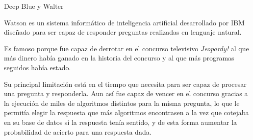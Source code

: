 \documentclass[spanish, a4paper, 12pt]{article} 	%
\begin{document}
\begin{section}{Deep Blue y Walter}
\begin{itemize}
		Watson es un sistema informático de inteligencia artificial desarrollado por IBM diseñado para ser capaz de responder preguntas realizadas en lenguaje natural.
	
		Es famoso porque fue capaz de derrotar en el concurso televisivo \textit{Jeopardy!} al que más dinero había ganado en la historia del concurso y al que más programas seguidos había estado.
	
		Su principal limitación está en el tiempo que necesita para ser capaz de procesar una pregunta y responderla. Aun así fue capaz de vencer en el concurso gracias a la ejecución de miles de algoritmos distintos para la misma pregunta, lo que le permitía elegir la respuesta que más algoritmos encontrasen a la vez que cotejaba en su base de datos si la respuesta tenía sentido, y de esta forma aumentar la probabilidad de acierto para una respuesta dada. 
		
	\end{itemize}
\end{section}
\end{document}
